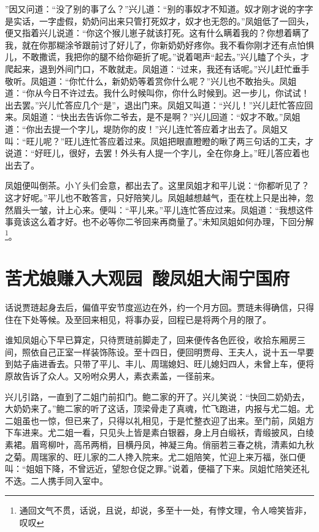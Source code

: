 \documentclass[12pt,oneside]{book}
\begin{document}
”因又问道：“没了别的事了么？”兴儿道：“别的事奴才不知道。奴才刚才说的字字是实话，一字虚假，奶奶问出来只管打死奴才，奴才也无怨的。”凤姐低了一回头，便又指着兴儿说道：“你这个猴儿崽子就该打死。这有什么瞒着我的？你想着瞒了我，就在你那糊涂爷跟前讨了好儿了，你新奶奶好疼你。我不看你刚才还有点怕惧儿，不敢撒谎，我把你的腿不给你砸折了呢。”说着喝声“起去。”兴儿瞌了个头，才爬起来，退到外间门口，不敢就走。凤姐道：“过来，我还有话呢。”兴儿赶忙垂手敬听。凤姐道：“你忙什么，新奶奶等着赏你什么呢？”兴儿也不敢抬头。凤姐道：“你从今日不许过去。我什么时候叫你，你什么时候到。迟一步儿，你试试！出去罢。”兴儿忙答应几个“是”，退出门来。凤姐又叫道：“兴儿！”兴儿赶忙答应回来。凤姐道：“快出去告诉你二爷去，是不是啊？”兴儿回道：“奴才不敢。”凤姐道：“你出去提一个字儿，堤防你的皮！”兴儿连忙答应着才出去了。凤姐又叫：“旺儿呢？”旺儿连忙答应着过来。凤姐把眼直瞪瞪的瞅了两三句话的工夫，才说道：“好旺儿，很好，去罢！外头有人提一个字儿，全在你身上。”旺儿答应着也出去了。

凤姐便叫倒茶。小丫头们会意，都出去了。这里凤姐才和平儿说：“你都听见了？这才好呢。”平儿也不敢答言，只好陪笑儿。凤姐越想越气，歪在枕上只是出神，忽然眉头一皱，计上心来。便叫：“平儿来。”平儿连忙答应过来。凤姐道：“我想这件事竟该这么着才好。也不必等你二爷回来再商量了。”未知凤姐如何办理，下回分解\footnote{通回文气不贯，话说，且说，却说，多至十一处，有悖文理，令人啼笑皆非，叹叹}。


 
\chapter{苦尤娘赚入大观园~酸凤姐大闹宁国府}
话说贾琏起身去后，偏值平安节度巡边在外，约一个月方回。贾琏未得确信，只得住在下处等候。及至回来相见，将事办妥，回程已是将两个月的限了。

谁知凤姐心下早已算定，只待贾琏前脚走了，回来便传各色匠役，收拾东厢房三间，照依自己正室一样装饰陈设。至十四日，便回明贾母、王夫人，说十五一早要到姑子庙进香去。只带了平儿、丰儿、周瑞媳妇、旺儿媳妇四人，未曾上车，便将原故告诉了众人。又吩咐众男人，素衣素盖，一径前来。

兴儿引路，一直到了二姐门前扣门。鲍二家的开了。兴儿笑说：“快回二奶奶去，大奶奶来了。”鲍二家的听了这话，顶梁骨走了真魂，忙飞跑进，内报与尤二姐。尤二姐虽也一惊，但已来了，只得以礼相见，于是忙整衣迎了出来。至门前，凤姐方下车进来。尤二姐一看，只见头上皆是素白银器，身上月白缎袄，青缎披风，白绫素裙。眉弯柳叶，高吊两梢，目横丹凤，神凝三角。俏丽若三春之桃，清素如九秋之菊。周瑞家的、旺儿家的二人搀入院来。尤二姐陪笑，忙迎上来万福，张口便叫：“姐姐下降，不曾远近，望恕仓促之罪。”说着，便福了下来。凤姐忙陪笑还礼不迭。二人携手同入室中。
\end{document}
